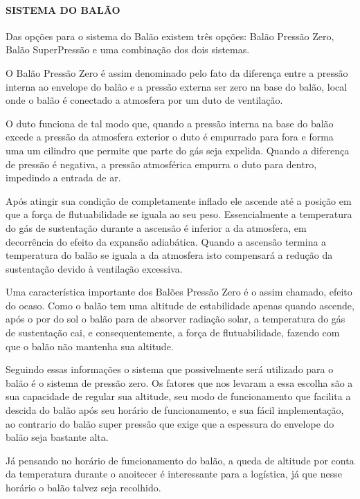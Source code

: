   \paragraph{SISTEMA DO BALÃO}
    Das opções para o sistema do Balão existem três opções: Balão Pressão Zero, Balão Super­Pressão e uma combinação dos dois sistemas.
    
    O Balão Pressão Zero é assim denominado pelo fato da diferença entre a pressão interna ao envelope do balão e a pressão externa ser zero na base do balão, local onde o balão é conectado a atmosfera por um duto de ventilação.
    
    O duto funciona de tal modo que, quando a pressão interna na base do balão excede a pressão da atmosfera exterior o duto é empurrado para fora e forma uma um cilindro que permite que parte do gás seja expelida. Quando a diferença de pressão é negativa, a pressão atmosférica empurra o duto para dentro, impedindo a entrada de ar.
    
    Após atingir sua condição de completamente inflado ele ascende até a posição em que a força de flutuabilidade se iguala ao seu peso. Essencialmente a temperatura do gás de sustentação durante a ascensão é inferior a da atmosfera, em decorrência do efeito da expansão adiabática. Quando a ascensão termina a temperatura do balão se iguala a da atmosfera isto compensará a redução da sustentação devido à ventilação excessiva.
    
    Uma característica importante dos Balões Pressão Zero é o assim chamado, efeito do ocaso. Como o balão tem uma altitude de estabilidade apenas quando ascende, após o por do sol o balão para de absorver radiação solar, a temperatura do gás de sustentação cai, e consequentemente, a força de flutuabilidade, fazendo com que o balão não mantenha sua altitude.
    
    Seguindo essas informações o sistema que possivelmente será utilizado para o balão é o sistema de pressão zero. Os fatores que nos levaram a essa escolha são a sua capacidade de regular sua altitude, seu modo de funcionamento que facilita a descida do balão após seu horário de funcionamento, e sua fácil implementação, ao contrario do balão super pressão que exige que a espessura do envelope do balão seja bastante alta.
    
    Já pensando no horário de funcionamento do balão, a queda de altitude por conta da temperatura durante o anoitecer é interessante para a logística, já que nesse horário o balão talvez seja recolhido.

